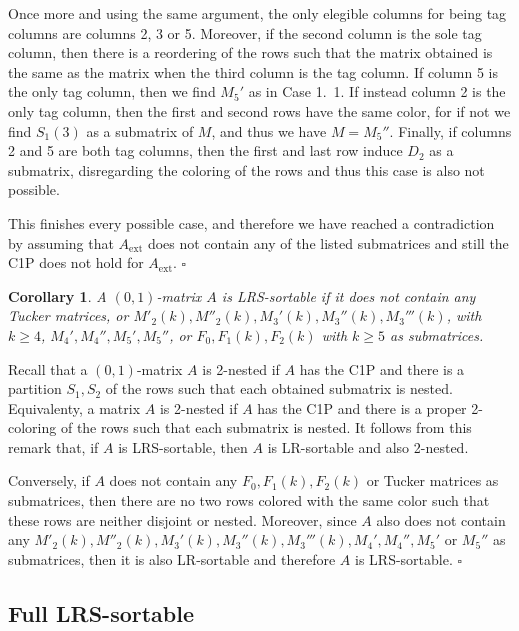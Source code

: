 \documentclass[a4paper,10pt]{report}
\theoremstyle{plain}
\newtheorem{cor}{Corollary}[chapter]
\theoremstyle{remark}
\theoremstyle{plain}
\newcommand*{\QED}{\hfill\ensuremath{\square}}%
\newcommand*{\ext}{\mathrm{ext}}
\begin{document}
{\vspace{2mm}

Once more and using the same argument, the only elegible columns for being tag columns are columns 2, 3 or 5. Moreover, if the second column is the sole tag column, then there is a reordering of the rows such that the matrix obtained is the same as the matrix when the third column is the tag column.
If column 5 is the only tag column, then we find $M_5'$ as in Case 1.\ 1.
If instead column 2 is the only tag column, then the first and second rows have the same color, for if not we find $S_1(3)$ as a submatrix of $M$, and thus we have $M= M_5''$.
Finally, if columns 2 and 5 are both tag columns, then the first and last row induce $D_2$ as a submatrix, disregarding the coloring of the rows and thus this case is also not possible. 

\vspace{2mm}
This finishes every possible case, and therefore we have reached a contradiction by assuming that $A_{\ext}$ does not contain any of the listed submatrices and still the C1P does not hold for $A_{\ext}$. \QED


\begin{cor} \label{teo:LRS-caract}
	A $(0,1)$-matrix $A$ is LRS-sortable if it does not contain any Tucker matrices, or $M'_2(k), M''_2(k), M_3'(k), M_3''(k), M_3'''(k)$, with $k \geq 4$, $M_4', M_4'', M_5', M_5''$, or $F_0, F_1(k), F_2(k)$ with $k \geq 5$ as submatrices. 
\end{cor}

Recall that a $(0,1)$-matrix $A$ is 2-nested if $A$ has the C1P and there is a partition $S_1, S_2$ of the rows such that each obtained submatrix is nested. Equivalenty, a matrix $A$ is 2-nested if $A$ has the C1P and there is a proper 2-coloring of the rows such that each submatrix is nested.
It follows from this remark that, if $A$ is LRS-sortable, then $A$ is LR-sortable and also 2-nested.

Conversely, if $A$ does not contain any $F_0, F_1(k), F_2(k)$ or Tucker matrices as submatrices, then there are no two rows colored with the same color such that these rows are neither disjoint or nested. Moreover, since $A$ also does not contain any $M'_2(k), M''_2(k), M_3'(k), M_3''(k), M_3'''(k), M_4', M_4'', M_5'$ or $M_5''$ as submatrices, then it is also LR-sortable and therefore $A$ is LRS-sortable. \QED

\subsection{Full LRS-sortable}

}
\end{document}
